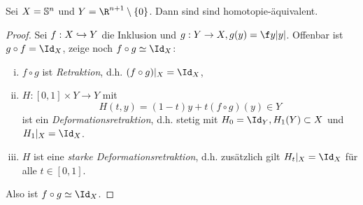 \begin{ex}
	Sei $X = \S^n$ und $Y = \R^{n+1} \setminus \{0\}$.
	Dann sind sind homotopie-äquivalent.
	\begin{proof}
		Sei $f: X \injto Y$ die Inklusion und $g: Y \to X, g(y) = \f y{|y|}$.
		Offenbar ist $g \circ f = \Id_X$, zeige noch $f \circ g \homotopic \Id_X$:
		\begin{enumerate}[i)]
			\item
				$f \circ g$ ist \emph{Retraktion}, d.h. $(f \circ g)|_X = \Id_X$,
			\item
				$H: [0,1] \times Y \to Y$ mit
				\[
					H(t,y) = (1-t)y + t (f \circ g)(y)
					\in Y
				\]
				ist ein \emph{Deformationsretraktion}, d.h. stetig mit $H_0 = \Id_Y, H_1(Y) \subset X$ und $H_1|_X = \Id_X$.
			\item
				$H$ ist eine \emph{starke Deformationsretraktion}, d.h. zusätzlich gilt $H_t|_X = \Id_X$ für alle $t \in [0,1]$.
		\end{enumerate}
		Also ist $f \circ g \homotopic \Id_X$.
	\end{proof}
\end{ex}




